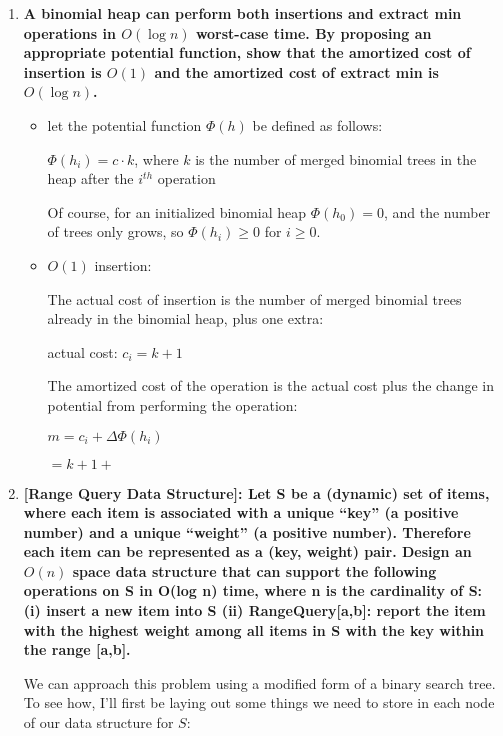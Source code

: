 \documentclass[12pt]{article}
\begin{document}
\begin{enumerate}
\begin{enumerate}
    \end{enumerate}

    \item \textbf{A binomial heap can perform both insertions and extract min operations in $O(\log n)$ 
    worst-case time. By proposing an appropriate potential function, show that the amortized 
    cost of insertion is $O(1)$ and the amortized cost of extract min is $O(\log n)$.}

    \begin{itemize}
        \item let the potential function $\Phi(h)$ be defined as follows:
        
        $\Phi(h_i) = c \cdot k$, where $k$ is the number of merged binomial trees in the heap after 
        the $i^{th}$ operation

        Of course, for an initialized binomial heap $\Phi(h_0) = 0$, and the number of trees only grows, so 
        $\Phi(h_i) \geq 0$ for $i \geq 0$.

        \item $O(1)$ insertion:
        
        The actual cost of insertion is the number of merged binomial trees already in the binomial heap, plus one 
        extra: 

        actual cost: $c_i = k + 1$

        The amortized cost of the operation is the actual cost plus the change in potential from performing the 
        operation:

        $m = c_i + \Delta \Phi(h_i)$

        $ = k + 1 + $

    \end{itemize}

    \item \textbf{[Range Query Data Structure]: Let S be a (dynamic) set of items, where each item is 
    associated with a unique ``key'' (a positive number) and a unique ``weight'' (a positive 
    number). Therefore each item can be represented as a (key, weight) pair. Design an $O(n)$ 
    space data structure that can support the following operations on S in O(log n) time, where 
    n is the cardinality of S: (i) insert a new item into S (ii) RangeQuery[a,b]: report the 
    item with the highest weight among all items in S with the key within the range [a,b].}

    We can approach this problem using a modified form of a binary search tree. To see how, I'll first be laying out 
    some things we need to store in each node of our data structure for $S$:


\end{enumerate}
\end{document}
